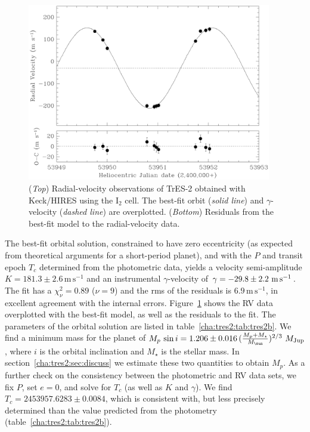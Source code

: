 \begin{figure}
\begin{center}
\includegraphics[width=0.95\textwidth]{4_f2}
\caption[Radial-velocity observations of TrES-2]{({\it Top}) Radial-velocity observations of TrES-2 obtained
  with Keck/HIRES using the I$_{2}$ cell. The best-fit orbit
  (\textit{solid line}) and $\gamma$-velocity (\textit{dashed line})
  are overplotted. ({\it Bottom}) Residuals from the best-fit
  model to the radial-velocity data.}
\label{cha:tres2:fig:rvtres2}
\end{center}
\end{figure}

The best-fit orbital solution, constrained to have zero eccentricity
(as expected from theoretical arguments for a short-period planet),
and with the $P$ and transit epoch $T_{c}$ determined from the
photometric data, yields a velocity semi-amplitude $K =
181.3\pm2.6\,\mathrm{m\,s^{-1}}$ and an instrumental
${\gamma}$-velocity of ${\gamma} = -29.8 \pm 2.2\ {\rm m\,
  s^{-1}}$. The fit has a $\chi^2_\nu = 0.89$ ($\nu=9$) and the rms of the
residuals is $6.9\,\mathrm{m\,s^{-1}}$, in excellent agreement with
the internal errors.  Figure~\ref{cha:tres2:fig:rvtres2} shows the RV data
overplotted with the best-fit model, as well as the residuals to the
fit. The parameters of the orbital solution are listed in
table~\ref{cha:tres2:tab:tres2b}. We find a minimum mass for the planet of
$M_{p}\, \sin{i} = 1.206 \pm 0.016\, (\frac{M_p + M_{\star}}{M_{\sun}})^{2/3}\ M_{\rm Jup}$,
where $i$ is
the orbital inclination and $M_{\star}$
is the stellar mass.  In section~\ref{cha:tres2:sec:discuss} we estimate these two quantities to obtain
$M_{p}$.  As a further check on the consistency between the
photometric and RV data sets, we fix $P$, set $e=0$, and solve for
$T_c$ (as well as $K$ and ${\gamma}$).  We find $T_{c}=2453957.6283
\pm 0.0084$, which is consistent with, but less precisely determined
than the value predicted from the photometry (table~\ref{cha:tres2:tab:tres2b}).

